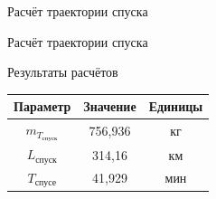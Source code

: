 \begin{frame}{Расчёт траектории спуска} %
        \begin{minipage}[c]{0.45\textwidth}
        \end{minipage}
        \begin{minipage}[c]{0.45\textwidth}
        \end{minipage}
\end{frame}

\begin{frame}{Расчёт траектории спуска}
    \begin{block}{Результаты расчётов}
        \begin{table}
            \begin{tabular}{|c|c|c|}
                \hline
                Параметр& Значение & Единицы\\ \hline
                $m_{T_\text{спуск}}$&756,936 & кг\\ \hline
                $L_\text{спуск}$& 314,16 &км \\ \hline
                $T_\text{спусе}$& 41,929 & мин\\ \hline
            \end{tabular}
        \end{table}
    \end{block}
\end{frame}

